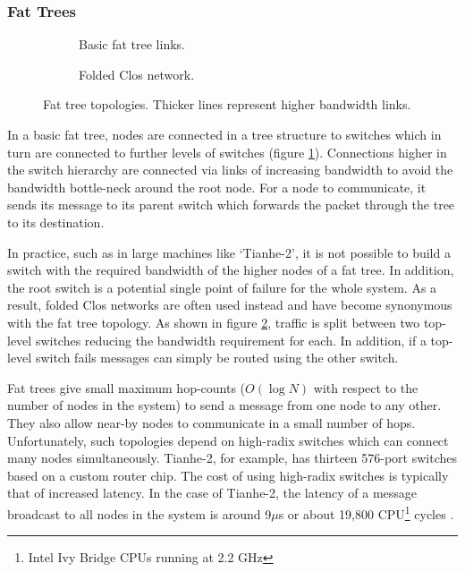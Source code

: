 			\subsubsection{Fat Trees}
				
				\begin{figure}
					\begin{subfigure}[t]{\textwidth}
						\center
						
						\caption{Basic fat tree links.}
						\label{fig:fat-tree-concept}
					\end{subfigure}
					
					\vspace{1em}
					
					\begin{subfigure}[t]{\textwidth}
						\center
						
						\caption{Folded Clos network.}
						\label{fig:fat-tree-closs}
					\end{subfigure}
					
					\caption[Fat tree topologies.]{Fat tree topologies. Thicker lines
					represent higher bandwidth links.}
					\label{fig:fat-tree}
				\end{figure}
			
				In a basic fat tree, nodes are connected in a tree structure to switches
				which in turn are connected to further levels of switches (figure
				\ref{fig:fat-tree-concept}). Connections higher in the switch hierarchy
				are connected via links of increasing bandwidth to avoid the bandwidth
				bottle-neck around the root node. For a node to communicate, it
				sends its message to its parent switch which forwards the packet through
				the tree to its destination.
				
				In practice, such as in large machines like `Tianhe-2', it is not
				possible to build a switch with the required bandwidth of the higher
				nodes of a fat tree. In addition, the root switch is a potential single
				point of failure for the whole system. As a result, folded Clos networks
				are often used instead and have become synonymous with the fat tree
				topology. As shown in figure \ref{fig:fat-tree-closs}, traffic is split
				between two top-level switches reducing the bandwidth requirement for
				each. In addition, if a top-level switch fails messages can simply be
				routed using the other switch.
				
				Fat trees give small maximum hop-counts ($O(\log{N})$ with respect to
				the number of nodes in the system) to send a message from one node to
				any other. They also allow near-by nodes to communicate in a small
				number of hops. Unfortunately, such topologies depend on high-radix
				switches which can connect many nodes simultaneously.  Tianhe-2, for
				example, has thirteen 576-port switches based on a custom router chip.
				The cost of using high-radix switches is typically that of increased
				latency. In the case of Tianhe-2, the latency of a message broadcast to
				all nodes in the system is around 9$\mu$s or about 19,800
				CPU\footnote{Intel Ivy Bridge CPUs running at 2.2 GHz} cycles
				\cite{dongarra13}.
				
